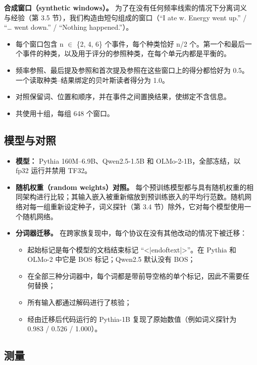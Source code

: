\documentclass[UTF8,fontset=none,a4paper]{ctexart}
\begin{document}
\textbf{合成窗口（synthetic windows）。} 为了在没有任何频率线索的情况下分离词义与经验（第 3.5 节），我们构造由短句组成的窗口（``I ate w. Energy went up.'' / ``\ldots{} went down.'' / ``Nothing happened.''）。
\begin{itemize}
\item 每个窗口包含 n $\in$ \{2, 4, 6\} 个事件，每个种类恰好 n/2 个。第一个和最后一个事件的种类，以及用于评分的参照种类，在每个单元内都是平衡的。
\item 频率参照、最后提及参照和首次提及参照在这些窗口上的得分都恰好为 0.5。一个读取种类--结果绑定的贝叶斯读者得分为 1.0。
\item 对照保留词、位置和顺序，并在事件之间置换结果，使绑定不含信息。
\item 共使用十组，每组 648 个窗口。
\end{itemize}

\subsection{模型与对照}

\begin{itemize}
\item \textbf{模型：} Pythia \mbox{160M--6.9B}、\mbox{Qwen2.5-1.5B} 和 \mbox{OLMo-2-1B}，全部冻结，以 fp32 运行并禁用 TF32。
\item \textbf{随机权重（random weights）对照。} 每个预训练模型都与具有随机权重的相同架构进行比较；其输入嵌入被重新缩放到预训练嵌入的平均行范数。随机网络对每一组重新设定种子，词义探针（第 3.4 节）除外，它对每个模型使用一个随机网络。
\item \textbf{分词器迁移。} 在跨家族复现中，每个协议在没有其他改动的情况下被迁移：
\begin{itemize}
\item 起始标记是每个模型的文档结束标记 ``<|endoftext|>''。在 Pythia 和 \mbox{OLMo-2} 中它是 BOS 标记；Qwen2.5 默认没有 BOS；
\item 在全部三种分词器中，每个词都是带前导空格的单个标记，因此不需要任何替换；
\item 所有输入都通过解码进行了核验；
\item 经由迁移后代码运行的 \mbox{Pythia-1B} 复现了原始数值（例如词义探针为 0.983 / 0.526 / 1.000）。
\end{itemize}
\end{itemize}

\subsection{测量}
\end{document}
